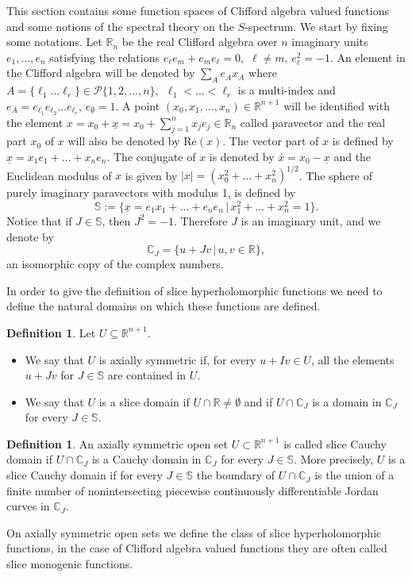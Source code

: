 \documentclass[reqno,11pt]{amsart}
\numberwithin{equation}{section}
\theoremstyle{definition}
\newtheorem{definition}[theorem]{Definition}
\renewcommand{\Re}{\mathrm{Re}}
\begin{document}
This section contains some function spaces of Clifford algebra valued functions and
some notions of the spectral theory on the $S$-spectrum.
We start by fixing some notations.
 Let $\mathbb{R}_n$ be the real Clifford algebra over $n$ imaginary units $e_1,\ldots ,e_n$
satisfying the relations $e_\ell e_m+e_me_\ell=0$,\  $\ell\not= m$, $e_\ell^2=-1.$
An element in the Clifford algebra will be denoted by $\sum_A e_Ax_A$ where
$A=\{ \ell_1\ldots \ell_r\}\in \mathcal{P}\{1,2,\ldots, n\},\ \  \ell_1<\ldots <\ell_r$
is a multi-index
and $e_A=e_{\ell_1} e_{\ell_2}\ldots e_{\ell_r}$, $e_\emptyset =1$.
A point $(x_0,x_1,\ldots,x_n)\in \mathbb{R}^{n+1}$  will be identified with the element
$
x=x_0+\underline{x}=x_0+ \sum_{j=1}^n x_j e_j\in\mathbb{R}_n
$
called paravector and the real part $x_0$ of $x$ will also be denoted by $\Re(x)$.
The vector part of $x$ is defined by
$\underline{x}=x_1e_1+\ldots+x_ne_n$.
The conjugate of $x$ is denoted by $\overline{x}=x_0-\underline{x}$
and the Euclidean modulus of $x$ is given by $|x|=(x_0^2+\ldots +x_n^2)^{1/2}$.
The sphere of purely imaginary paravectors with modulus 1, is defined by
$$ \mathbb{S}:= \{\underline{x}= e_{1}x_1+ \ldots+e_n e_n\, | \, x_1^2+ \ldots +x_n^2=1\}.$$
Notice that if $J \in \mathbb{S}$, then $J^2=-1$. Therefore $J$ is an imaginary unit, and we denote by
$$ \mathbb{C}_J= \{u+Jv \, | \, u,v \in \mathbb{R}\},$$
an isomorphic copy of the complex numbers.


In order to give the definition of slice hyperholomorphic functions we need to
define the natural domains on which these functions are defined.



\begin{definition}
	Let $U \subseteq \mathbb{R}^{n+1}$.
	\begin{itemize}
		\item We say that $U$ is axially symmetric if, for every $u+Iv \in U$, all the elements $u+Jv$ for $J \in \mathbb{S}$ are contained in $U$.
		\item We say that $U$ is a slice domain if $U \cap \mathbb{R} \neq \emptyset$ and if $U \cap \mathbb{C}_J$ is a domain in $\mathbb{C}_J$ for every $J \in \mathbb{S}$.
	\end{itemize}
	
\end{definition}
\begin{definition}
	An axially symmetric open set $U \subset \mathbb{R}^{n+1}$ is called slice Cauchy domain if $U \cap \mathbb{C}_J$ is a Cauchy domain in $ \mathbb{C}_J$ for every $J \in \mathbb{S}$. More precisely, $U$ is a slice Cauchy domain if for every $J \in \mathbb{S}$ the boundary of $ U \cap \mathbb{C}_J$ is the union of a finite number of nonintersecting piecewise continuously differentiable Jordan curves in $ \mathbb{C}_J$.
\end{definition}
On axially symmetric open sets we define the class of slice hyperholomorphic functions, in the case of Clifford algebra valued functions they are often called slice monogenic functions.
\end{document}
